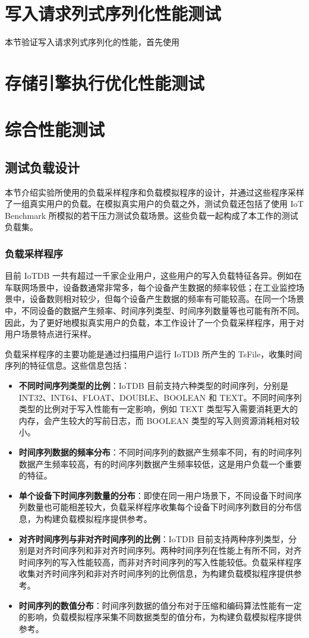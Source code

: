 \section{写入请求列式序列化性能测试}
本节验证写入请求列式序列化的性能，首先使用
\section{存储引擎执行优化性能测试}

\section{综合性能测试}
\subsection{测试负载设计}
本节介绍实验所使用的负载采样程序和负载模拟程序的设计，并通过这些程序采样了一组真实用户的负载。在模拟真实用户的负载之外，测试负载还包括了使用 IoT Benchmark 所模拟的若干压力测试负载场景。这些负载一起构成了本工作的测试负载集。
\subsubsection{负载采样程序}
目前 IoTDB 一共有超过一千家企业用户，这些用户的写入负载特征各异。例如在车联网场景中，设备数通常非常多，每个设备产生数据的频率较低；在工业监控场景中，设备数则相对较少，但每个设备产生数据的频率有可能较高。在同一个场景中，不同设备的数据产生频率、时间序列类型、时间序列数量等也可能有所不同。因此，为了更好地模拟真实用户的负载，本工作设计了一个负载采样程序，用于对用户场景特点进行采样。

负载采样程序的主要功能是通过扫描用户运行 IoTDB 所产生的 TsFile，收集时间序列的特征信息。这些信息包括：
\begin{itemize}
  \item \textbf{不同时间序列类型的比例}：IoTDB 目前支持六种类型的时间序列，分别是 INT32、INT64、FLOAT、DOUBLE、BOOLEAN 和 TEXT。不同时间序列类型的比例对于写入性能有一定影响，例如 TEXT 类型写入需要消耗更大的内存，会产生较大的写前日志，而 BOOLEAN 类型的写入则资源消耗相对较小。
  \item \textbf{时间序列数据的频率分布}：不同时间序列的数据产生频率不同，有的时间序列数据产生频率较高，有的时间序列数据产生频率较低，这是用户负载一个重要的特征。
  \item \textbf{单个设备下时间序列数量的分布}：即使在同一用户场景下，不同设备下时间序列数量也可能相差较大，负载采样程序收集每个设备下时间序列数目的分布信息，为构建负载模拟程序提供参考。
  \item \textbf{对齐时间序列与非对齐时间序列的比例}：IoTDB 目前支持两种序列类型，分别是对齐时间序列和非对齐时间序列。两种时间序列在性能上有所不同，对齐时间序列的写入性能较高，而非对齐时间序列的写入性能较低。负载采样程序收集对齐时间序列和非对齐时间序列的比例信息，为构建负载模拟程序提供参考。
  \item \textbf{时间序列的数值分布}：时间序列数据的值分布对于压缩和编码算法性能有一定的影响，负载模拟程序采集不同数据类型的值分布，为构建负载模拟程序提供参考。
\end{itemize}

